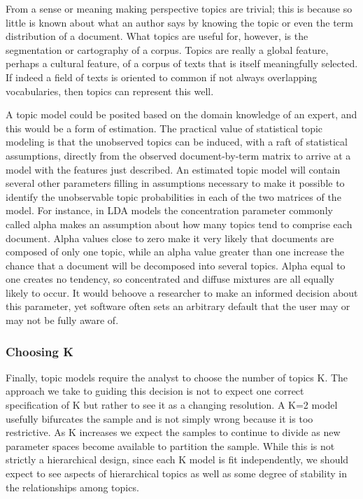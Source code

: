 \documentclass[]{book}
\theoremstyle{definition}
\theoremstyle{definition}
\theoremstyle{definition}
\theoremstyle{remark}
\begin{document}
From a sense or meaning making perspective topics are trivial; this is
because so little is known about what an author says by knowing the
topic or even the term distribution of a document. What topics are
useful for, however, is the segmentation or cartography of a corpus.
Topics are really a global feature, perhaps a cultural feature, of a
corpus of texts that is itself meaningfully selected. If indeed a field
of texts is oriented to common if not always overlapping vocabularies,
then topics can represent this well.

A topic model could be posited based on the domain knowledge of an
expert, and this would be a form of estimation. The practical value of
statistical topic modeling is that the unobserved topics can be induced,
with a raft of statistical assumptions, directly from the observed
document-by-term matrix to arrive at a model with the features just
described. An estimated topic model will contain several other
parameters filling in assumptions necessary to make it possible to
identify the unobservable topic probabilities in each of the two
matrices of the model. For instance, in LDA models the concentration
parameter commonly called alpha makes an assumption about how many
topics tend to comprise each document. Alpha values close to zero make
it very likely that documents are composed of only one topic, while an
alpha value greater than one increase the chance that a document will be
decomposed into several topics. Alpha equal to one creates no tendency,
so concentrated and diffuse mixtures are all equally likely to occur. It
would behoove a researcher to make an informed decision about this
parameter, yet software often sets an arbitrary default that the user
may or may not be fully aware of.

\hypertarget{choosing-k}{%
\subsubsection{Choosing K}\label{choosing-k}}

Finally, topic models require the analyst to choose the number of topics
K. The approach we take to guiding this decision is not to expect one
correct specification of K but rather to see it as a changing
resolution. A K=2 model usefully bifurcates the sample and is not simply
wrong because it is too restrictive. As K increases we expect the
samples to continue to divide as new parameter spaces become available
to partition the sample. While this is not strictly a hierarchical
design, since each K model is fit independently, we should expect to see
aspects of hierarchical topics as well as some degree of stability in
the relationships among topics.
\end{document}
